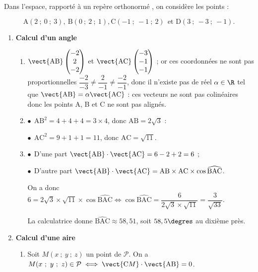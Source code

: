 
\medskip

Dans l'espace, rapporté à un repère orthonormé \Oijk, on considère les points : 

\[\text{A}(2~;~0~;~3),\: \text{B}(0~;~2~;~1), \text{C}(-1~;~-1~;~2)\:\: \text{et D}(3~;~-3~;~ -1).\]
\smallskip

\begin{enumerate}
\item \textbf{Calcul d'un angle}
	\begin{enumerate}
		\item %
$\vect{\text{AB}}\begin{pmatrix}-2\\2\\-2\end{pmatrix}$ et $\vect{\text{AC}}\begin{pmatrix}-3\\-1\\-1\end{pmatrix}$ ; or ces coordonnées ne sont pas proportionnelles $\dfrac{-2}{-3} \ne \dfrac{2}{-1} \ne \dfrac{-2}{-1}$, donc il n'existe pas de réel $\alpha \in \R$ tel que $\vect{\text{AB}} = \alpha\vect{\text{AC}}$ : ces vecteurs ne sont pas colinéaires donc les points A, B et C ne sont pas alignés.
		\item %
$\bullet~~$$\text{AB}^2 = 4 + 4 + 4 = 3 \times 4$, donc $\text{AB} = 2\sqrt{3}$ :

$\bullet~~$$\text{AC}^2 = 9 + 1 + 1 = 11$, donc $\text{AC} = \sqrt{11}$.
		\item %
$\bullet~~$D'une part $\vect{\text{AB}}\cdot \vect{\text{AC}} = 6 - 2 + 2 = 6$ ;

$\bullet~~$D'autre part $\vect{\text{AB}}\cdot \vect{\text{AC}} = \text{AB} \times \text{AC} \times \cos \widehat{\text{BAC}}$.

On a donc $6 = 2\sqrt{3} \times \sqrt{11} \times \cos \widehat{\text{BAC}} \iff \cos \widehat{\text{BAC}} = \dfrac{6}{2\sqrt{3} \times \sqrt{11}} = \dfrac{3}{\sqrt{33}}$.

La calculatrice donne $\widehat{\text{BAC}} \approx 58,51$, soit $58,5\degres$ au dixième près.
	\end{enumerate}
\item \textbf{Calcul d'une aire}
	\begin{enumerate}
		\item %
		Soit $M(x~;~y~;~z)$ un point de $\mathcal{P}$. On a $M(x~;~y~;~z) \in\mathcal{P} \iff \vect{\text{C}M} \cdot \vect{\text{AB}} = 0$. 
		

\end{enumerate}
\end{enumerate}
